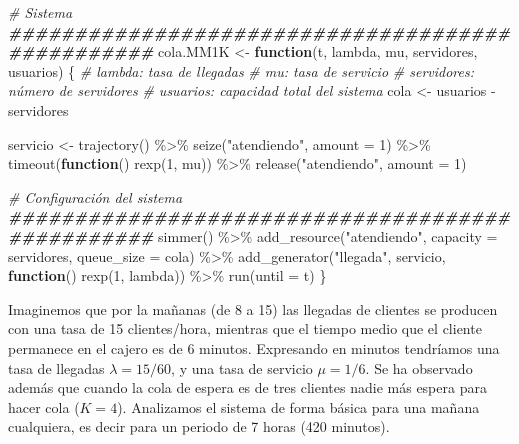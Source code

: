 \documentclass[
]{book}
\newenvironment{Shaded}{\begin{snugshade}}{\end{snugshade}}
\newcommand{\AttributeTok}[1]{\textcolor[rgb]{0.77,0.63,0.00}{#1}}
\newcommand{\CommentTok}[1]{\textcolor[rgb]{0.56,0.35,0.01}{\textit{#1}}}
\newcommand{\ControlFlowTok}[1]{\textcolor[rgb]{0.13,0.29,0.53}{\textbf{#1}}}
\newcommand{\DecValTok}[1]{\textcolor[rgb]{0.00,0.00,0.81}{#1}}
\newcommand{\DocumentationTok}[1]{\textcolor[rgb]{0.56,0.35,0.01}{\textbf{\textit{#1}}}}
\newcommand{\FunctionTok}[1]{\textcolor[rgb]{0.00,0.00,0.00}{#1}}
\newcommand{\NormalTok}[1]{#1}
\newcommand{\OtherTok}[1]{\textcolor[rgb]{0.56,0.35,0.01}{#1}}
\newcommand{\SpecialCharTok}[1]{\textcolor[rgb]{0.00,0.00,0.00}{#1}}
\newcommand{\StringTok}[1]{\textcolor[rgb]{0.31,0.60,0.02}{#1}}
\theoremstyle{definition}
\theoremstyle{definition}
\theoremstyle{definition}
\theoremstyle{definition}
\theoremstyle{remark}
\begin{document}
\begin{Shaded}
\begin{Highlighting}[]
\CommentTok{\# Sistema}
\DocumentationTok{\#\#\#\#\#\#\#\#\#\#\#\#\#\#\#\#\#\#\#\#\#\#\#\#\#\#\#\#\#\#\#\#\#\#\#\#\#\#\#\#\#\#\#\#\#\#\#\#\#}
\NormalTok{cola.MM1K }\OtherTok{\textless{}{-}} \ControlFlowTok{function}\NormalTok{(t, lambda, mu, servidores, usuarios)}
\NormalTok{\{}
  \CommentTok{\# lambda: tasa de llegadas}
  \CommentTok{\# mu: tasa de servicio}
  \CommentTok{\# servidores: número de servidores}
  \CommentTok{\# usuarios: capacidad total del sistema}
\NormalTok{  cola }\OtherTok{\textless{}{-}}\NormalTok{ usuarios }\SpecialCharTok{{-}}\NormalTok{ servidores}
  
\NormalTok{  servicio }\OtherTok{\textless{}{-}} \FunctionTok{trajectory}\NormalTok{() }\SpecialCharTok{\%\textgreater{}\%}
    \FunctionTok{seize}\NormalTok{(}\StringTok{"atendiendo"}\NormalTok{, }\AttributeTok{amount =} \DecValTok{1}\NormalTok{) }\SpecialCharTok{\%\textgreater{}\%}              
    \FunctionTok{timeout}\NormalTok{(}\ControlFlowTok{function}\NormalTok{() }\FunctionTok{rexp}\NormalTok{(}\DecValTok{1}\NormalTok{, mu)) }\SpecialCharTok{\%\textgreater{}\%}   
    \FunctionTok{release}\NormalTok{(}\StringTok{"atendiendo"}\NormalTok{, }\AttributeTok{amount =} \DecValTok{1}\NormalTok{)               }

  \CommentTok{\# Configuración del sistema }
  \DocumentationTok{\#\#\#\#\#\#\#\#\#\#\#\#\#\#\#\#\#\#\#\#\#\#\#\#\#\#\#\#\#\#\#\#\#\#\#\#\#\#\#\#\#\#\#\#\#\#\#\#\#}
  \FunctionTok{simmer}\NormalTok{() }\SpecialCharTok{\%\textgreater{}\%}
    \FunctionTok{add\_resource}\NormalTok{(}\StringTok{"atendiendo"}\NormalTok{, }\AttributeTok{capacity =}\NormalTok{ servidores, }\AttributeTok{queue\_size =}\NormalTok{ cola) }\SpecialCharTok{\%\textgreater{}\%}           
    \FunctionTok{add\_generator}\NormalTok{(}\StringTok{"llegada"}\NormalTok{, servicio, }\ControlFlowTok{function}\NormalTok{() }\FunctionTok{rexp}\NormalTok{(}\DecValTok{1}\NormalTok{, lambda)) }\SpecialCharTok{\%\textgreater{}\%} 
    \FunctionTok{run}\NormalTok{(}\AttributeTok{until =}\NormalTok{ t)     }
\NormalTok{\}}
\end{Highlighting}
\end{Shaded}

Imaginemos que por la mañanas (de 8 a 15) las llegadas de clientes se producen con una tasa de 15 clientes/hora, mientras que el tiempo medio que el cliente permanece en el cajero es de 6 minutos. Expresando en minutos tendríamos una tasa de llegadas \(\lambda = 15/60\), y una tasa de servicio \(\mu = 1/6\). Se ha observado además que cuando la cola de espera es de tres clientes nadie más espera para hacer cola (\(K = 4\)). Analizamos el sistema de forma básica para una mañana cualquiera, es decir para un periodo de 7 horas (420 minutos).
\end{document}
